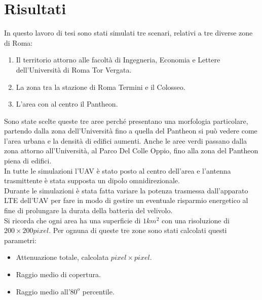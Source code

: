 \chapter{Risultati}
\label{cap:risultati}
In questo lavoro di tesi sono stati simulati tre scenari, relativi a tre diverse zone di Roma:
\begin{enumerate}
 \item Il territorio attorno alle facoltà di Ingegneria, Economia e Lettere dell'Università di Roma Tor Vergata.
 \item La zona tra la stazione di Roma Termini e il Colosseo.
 \item L'area con al centro il Pantheon.
\end{enumerate}
Sono state scelte queste tre aree perché presentano una morfologia particolare, partendo dalla zona dell'Università fino a quella 
del Pantheon si può vedere come l'area urbana e la densità di edifici aumenti. Anche le aree verdi passano dalla zona attorno 
all'Università, al Parco Del Colle Oppio, fino alla zona del Pantheon piena di edifici. \\
In tutte le simulazioni l'\ac{UAV} è stato posto al centro dell'area e l'antenna trasmittente è stata supposta un dipolo omnidirezionale. \\
Durante le simulazioni è stata fatta variare la potenza trasmessa dall'apparato \ac{LTE} dell'\ac{UAV} per fare in modo di gestire un 
eventuale risparmio energetico al fine di prolungare la durata della batteria del velivolo. \\
Si ricorda che ogni area ha una superficie di $1km^2$ con una risoluzione di $200 \times 200 pixel$.
Per ognuna di queste tre zone sono stati calcolati questi parametri:
\begin{itemize}
 \item Attenuazione totale, calcolata $pixel \times pixel$.
 \item Raggio medio di copertura.
 \item Raggio medio all'$80^o$ percentile.
\end{itemize}

